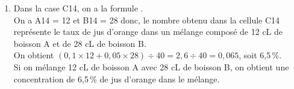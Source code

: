 \begin{corrige}
\begin{enumerate}
      {\blue Pour avoir 8\,\% de jus d'orange dans le mélange, il faut 24 cL de boisson A et 16 cL de boisson B.}
   \item Dans la case C14, on a la formule . \\
      On a A14 = 12 et B14 = 28 donc, le nombre obtenu dans la cellule C14 représente le taux de jus d'orange dans un mélange composé de 12 cL de boisson A et de 28 cL de boisson B. \\
      On obtient $(0,1\times12+0,05\times28)\div40 =2,6\div40 = 0,065$, soit 6,5\,\%. \\
      {\blue Si on mélange 12 cL de boisson A avec 28 cL de boisson B, on obtient une concentration de 6,5\,\% de jus d'orange dans le mélange.}
\end{enumerate}
\end{corrige}



